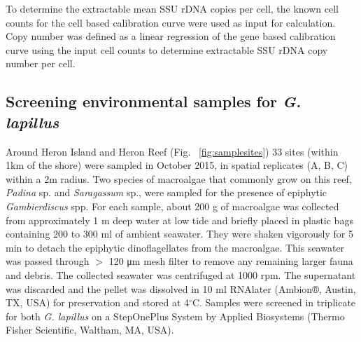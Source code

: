 \documentclass[12pt]{article}
\begin{document}
To determine the extractable mean SSU rDNA copies per cell, the known cell counts for the cell based calibration curve were used as input for calculation. 
Copy number was defined as a linear regression of the gene based calibration curve using the input cell counts to determine extractable SSU rDNA copy number per cell.

\subsection*{Screening environmental samples for \emph{G. lapillus}}%
\FloatBarrier
Around Heron Island and Heron Reef (Fig. ~\ref{fig:samplesites}) 33 sites (within 1km of the shore) were sampled in October 2015, in spatial replicates (A, B, C) within a 2m radius. 
Two species of macroalgae that commonly grow on this reef, \textit{Padina} sp. and \textit{Saragassum} sp., were sampled for the presence of epiphytic \emph{Gambierdiscus} spp. For each sample, about 200 g of macroalgae was collected from approximately 1 m deep water at low tide and briefly placed in plastic bags containing 200 to 300 ml of ambient seawater. 
They were shaken vigorously for 5 min to detach the epiphytic dinoflagellates from the macroalgae. 
This seawater was passed through $>$ 120 μm mesh filter to remove any remaining larger fauna and debris. 
The collected seawater was centrifuged at 1000 rpm. The supernatant was discarded and the pellet was dissolved in 10 ml RNAlater (Ambion®, Austin, TX, USA) for preservation and stored at 4$^{\circ}$C.
Samples were screened in triplicate for both \emph{G. lapillus} %
on a StepOnePlus System by Applied Biosystems (Thermo Fisher Scientific, Waltham, MA, USA).
\end{document}
